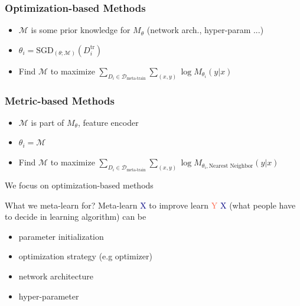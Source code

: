\documentclass{beamer}
\begin{document}
\begin{frame}[t]
  \frametitle{Optimization-based Methods}
  \begin{itemize}
    \item $\mathcal{M}$ is some prior knowledge for $M_\theta$ (network arch., hyper-param ...)
    \item $\theta_i = \text{SGD}_{(\theta;\mathcal{M})}(D_{i}^{\text{tr}})$
    \item Find $\mathcal{M}$ to maximize $\sum_{D_i \in \mathcal{D}_{\text{meta-train}}}\sum_{(x,y)} \log M_{\theta_i}(y|x)$
  \end{itemize}
\end{frame}

\begin{frame}[t]
  \frametitle{Metric-based Methods}
  \begin{itemize}
    \item $\mathcal{M}$ is part of $M_\theta$, feature encoder
    \item $\theta_i = \mathcal{M}$
    \item Find $\mathcal{M}$ to maximize $\sum_{D_i \in \mathcal{D}_{\text{meta-train}}}\sum_{(x,y)} \log M_{\theta_i, \text{Nearest Neighbor}}(y|x)$
  \end{itemize}
\end{frame}

\begin{frame}
	\begin{center}
    \LARGE{We focus on optimization-based methods}
	\end{center}
\end{frame}

\begin{frame}[t]{What we meta-learn for?}
  \centering Meta-learn \textcolor{navy}{X} to improve learn \textcolor{tomato}{Y}
  \pause
  \flushleft \textcolor{navy}{X} (what people have to decide in learning algorithm) can be
  \begin{itemize}
    \item parameter initialization
    \item optimization strategy (e.g optimizer)
    \item network architecture
    \item hyper-parameter
  \end{itemize}
\end{frame}
\end{document}

